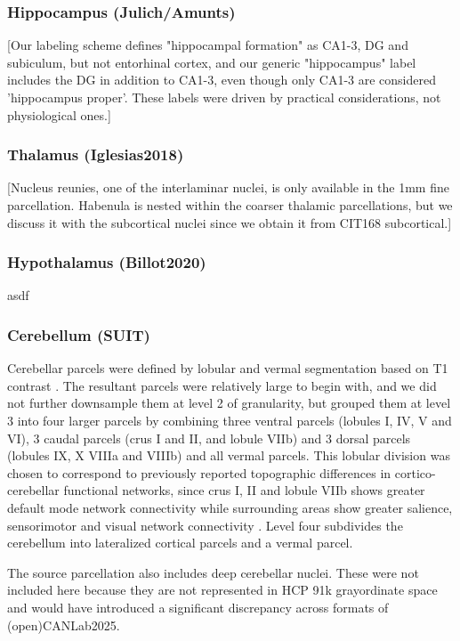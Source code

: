 \documentclass[10pt,letterpaper]{article}
\begin{document}
\subsubsection{Hippocampus (Julich/Amunts)} [Our labeling scheme defines "hippocampal formation" as CA1-3, DG and subiculum, but not entorhinal cortex, and our generic "hippocampus" label includes the DG in addition to CA1-3, even though only CA1-3 are considered 'hippocampus proper'. These labels were driven by practical considerations, not physiological ones.]
\\
\subsubsection{Thalamus (Iglesias2018)} [Nucleus reunies, one of the interlaminar nuclei, is only available in the 1mm fine parcellation. Habenula is nested within the coarser thalamic parcellations, but we discuss it with the subcortical nuclei since we obtain it from CIT168 subcortical.]
\\
\subsubsection{Hypothalamus (Billot2020)} asdf
\\
\subsubsection{Cerebellum (SUIT)} Cerebellar parcels were defined by lobular and vermal segmentation based on T1 contrast . The resultant parcels were relatively large to begin with, and we did not further downsample them at level 2 of granularity, but grouped them at level 3 into four larger parcels by combining three ventral parcels (lobules I, IV, V and VI), 3 caudal parcels (crus I and II, and lobule VIIb) and 3 dorsal parcels (lobules IX, X VIIIa and VIIIb) and all vermal parcels. This lobular division was chosen to correspond to previously reported topographic differences in cortico-cerebellar functional networks, since crus I, II and lobule VIIb shows greater default mode network connectivity while surrounding areas show greater salience, sensorimotor and visual network connectivity . Level four subdivides the cerebellum into lateralized cortical parcels and a vermal parcel.

The source parcellation  also includes deep cerebellar nuclei. These were not included here because they are not represented in HCP 91k grayordinate space and would have introduced a significant discrepancy across  formats of (open)CANLab2025.
\\
\end{document}
